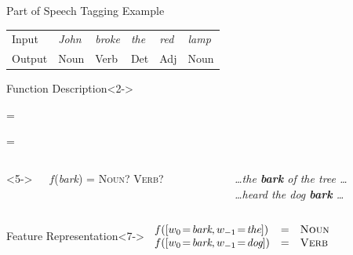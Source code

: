 \documentclass[14pt]{beamer}
\begin{document}
\begin{frame}{Part of Speech Tagging Example}
\begin{tabular}{llllll}
\textcolor{uabgreen}{Input}  & \em John & \em broke & \em the & \em red & \em lamp \\
\textcolor{uabgreen}{Output} & \sc Noun & \sc Verb  & \sc Det & \sc Adj & \sc Noun \\
\end{tabular}
\begin{block}{Function Description}<2->
\begin{description}[$D_f$]
\item[$D_f$] = 
\item[$R_f$] = 
\end{description}
\end{block}
\medskip
\begin{columns}<5->
\begin{column}{0.45\textwidth}
$f$(\textit{bark}) = \textsc{Noun}? \textsc{Verb}?
\end{column}
\begin{column}{0.5\textwidth}
\emph{\ldots the \textbf{bark} of the tree \ldots} \\
\emph{\ldots heard the dog \textbf{bark} \ldots} \\
\end{column}
\end{columns}
\begin{block}{Feature Representation}<7->
$\begin{array}{lll}
f([w_{0}\!=\!\textit{bark}, w_{-1}\!=\!\textit{the}]) & = & \textsc{Noun} \\
f([w_{0}\!=\!\textit{bark}, w_{-1}\!=\!\textit{dog}]) & = & \textsc{Verb}
\end{array}$
\end{block}
\end{frame}
\end{document}
